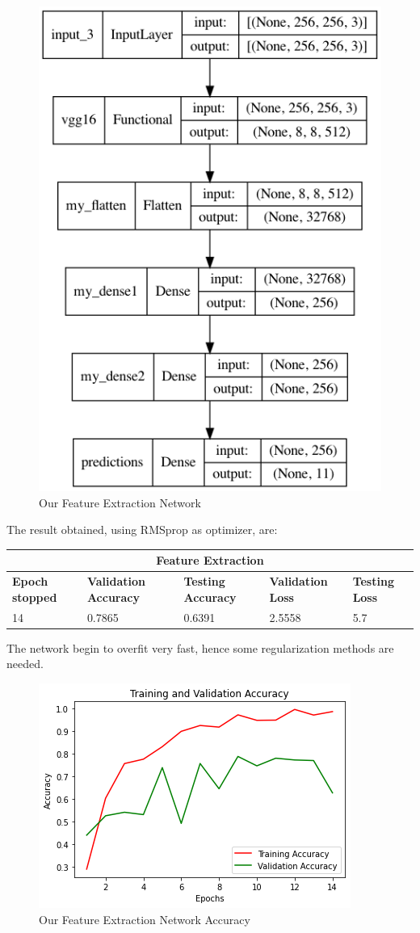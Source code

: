 \begin{figure}[H]
	\centering
	\includegraphics[height=0.5\textwidth]{img/vgg16fe1.png}
	\caption{Our Feature Extraction Network}
	\label{fig:vgg16fe1}
\end{figure}


\noindent The result obtained, using RMSprop as optimizer, are:

\medskip

\begin{tabular}{ |p{2cm}|p{2cm}|p{2cm}|p{2cm}|p{2cm}|  }
\hline
\multicolumn{5}{|c|}{Feature Extraction} \\
\hline
\textbf{Epoch stopped} & \textbf{Validation Accuracy} & \textbf{Testing Accuracy} & \textbf{Validation Loss} & \textbf{Testing Loss} \\
\hline
14 & 0.7865 & 0.6391 & 2.5558 & 5.7\\
\hline
\end{tabular}

\medskip

 \noindent The network begin to overfit very fast, hence some regularization methods are needed.


\begin{figure}[H]
	\centering
	\includegraphics[height=0.45\textwidth]{img/vgg16fe1acc.png}
	\caption{Our Feature Extraction Network Accuracy}
	\label{fig:vgg16fe1acc}
\end{figure}

